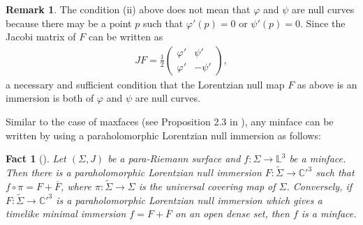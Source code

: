 \documentclass[11pt,reqno]{amsart}
\theoremstyle{plain} %
\newtheorem{fact}[theorem]{Fact}
\theoremstyle{definition}
\newtheorem{remark}[theorem]{Remark}
\begin{document}
\begin{remark}\label{Immersed condition}
The condition (ii) above does not mean that $\varphi$ and $\psi$ are null curves because there may be a point $p$ such that $\varphi'(p)=0$ or $\psi'(p)=0$. Since the Jacobi matrix of $F$ can be written as 
\begin{align*}
JF= \frac{1}{2}\left(
    \begin{array}{cc}
      \varphi' &\psi'   \\
     \varphi'  &-\psi'
      \end{array}
  \right),
\end{align*}
a necessary and sufficient condition that the Lorentzian null map $F$ as above is an immersion is both of $\varphi$ and $\psi$ are null curves.
\end{remark}


Similar to the case of maxfaces (see Proposition 2.3 in \cite{UY}), any minface can be written by using a paraholomorphic Lorentzian null immersion as follows:
\begin{fact}[\cite{T}]\label{fact:p-lift}
Let $(\Sigma, J)$ be a para-Riemann surface and $f : \Sigma \rightarrow \mathbb{L}^3$ be a minface. Then there is a paraholomorphic Lorentzian null immersion $F: \widetilde{\Sigma} \longrightarrow {\mathbb{C}'}^3$ such that $f\circ \pi=F+\overline{F}$, where $\pi: \widetilde{\Sigma} \longrightarrow \Sigma$ is the universal covering map of $\Sigma$. Conversely, if $F: \widetilde{\Sigma} \longrightarrow {\mathbb{C}'}^3$ is a paraholomorphic Lorentzian null immersion which gives a timelike minimal immersion $f=F+\overline{F}$ on an open dense set, then $f$ is a minface.
\end{fact}
\end{document}
